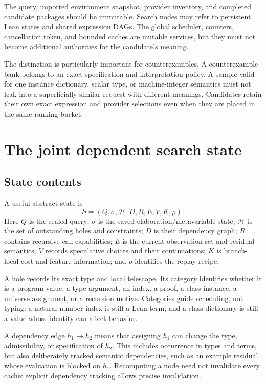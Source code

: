 \documentclass[11pt,letterpaper]{article}
\newcommand{\Goals}{\mathcal H}
\theoremstyle{definition}
\theoremstyle{remark}
\begin{document}
The query, imported environment snapshot, provider inventory, and completed candidate packages should be immutable. Search nodes may refer to persistent Lean states and shared expression DAGs. The global scheduler, counters, cancellation token, and bounded caches are mutable services, but they must not become additional authorities for the candidate's meaning.

The distinction is particularly important for counterexamples. A counterexample bank belongs to an exact specification and interpretation policy. A sample valid for one instance dictionary, scalar type, or machine-integer semantics must not leak into a superficially similar request with different meanings. Candidates retain their own exact expression and provider selections even when they are placed in the same ranking bucket.

\section{The joint dependent search state}
\label{sec:state}

\subsection{State contents}

A useful abstract state is
\begin{equation}
 S=(Q,\sigma,\Goals,D,R,E,V,K,\rho).
 \label{eq:state}
\end{equation}
Here $Q$ is the sealed query; $\sigma$ is the saved elaboration/metavariable state; $\Goals$ is the set of outstanding holes and constraints; $D$ is their dependency graph; $R$ contains recursive-call capabilities; $E$ is the current observation set and residual semantics; $V$ records speculative choices and their continuations; $K$ is branch-local cost and feature information; and $\rho$ identifies the replay recipe.

A hole records its exact type and local telescope. Its category identifies whether it is a program value, a type argument, an index, a proof, a class instance, a universe assignment, or a recursion motive. Categories guide scheduling, not typing: a natural-number index is still a Lean term, and a class dictionary is still a value whose identity can affect behavior.

A dependency edge $h_1\to h_2$ means that assigning $h_1$ can change the type, admissibility, or specification of $h_2$. This includes occurrence in types and terms, but also deliberately tracked semantic dependencies, such as an example residual whose evaluation is blocked on $h_1$. Recomputing a node need not invalidate every cache: explicit dependency tracking allows precise invalidation.
\end{document}

